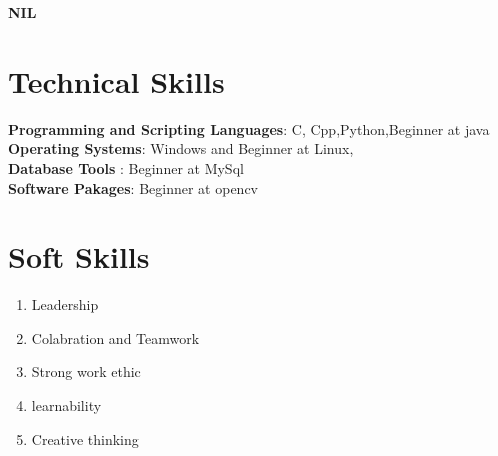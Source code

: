 \documentclass[margin,line]{res}
\begin{document}
\begin{resume}
\bf NIL
\vspace{.1in}
\section{\sc Technical Skills}
{\bf Programming and Scripting Languages}:  C, Cpp,Python,Beginner at java \\
{\bf Operating Systems}: Windows and Beginner at Linux,\\
{\bf Database Tools}  :  Beginner at MySql\\
{\bf Software Pakages}:  Beginner at opencv\\

\section{\sc Soft Skills}
\begin{enumerate} %
	\item Leadership 
	\item Colabration and Teamwork
	\item Strong work ethic 
	\item learnability 
	\item Creative thinking
\end{enumerate}
\end{resume}
\end{document}
